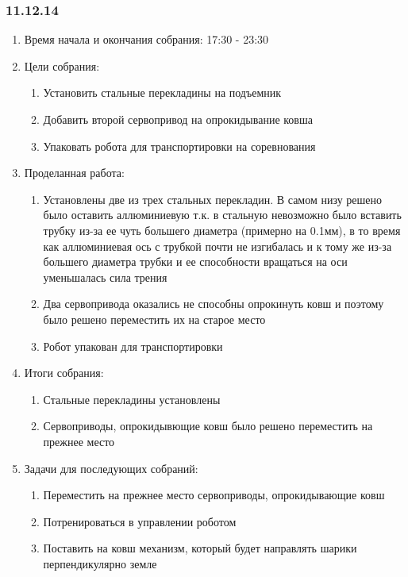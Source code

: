 \subsubsection{11.12.14}

\begin{enumerate}
	\item Время начала и окончания собрания: 17:30 - 23:30
	\item Цели собрания:
	\begin{enumerate}
		\item Установить стальные перекладины на подъемник
		
		\item Добавить второй сервопривод на опрокидывание ковша
		
		\item Упаковать робота для транспортировки на соревнования
	\end{enumerate}
	\item Проделанная работа:
	\begin{enumerate}
		\item Установлены две из трех стальных перекладин. В самом низу решено было оставить аллюминиевую т.к. в стальную невозможно было вставить трубку из-за ее чуть большего диаметра (примерно на 0.1мм), в то время как аллюминиевая ось с трубкой почти не изгибалась и к тому же из-за большего диаметра трубки и ее способности вращаться на оси уменьшалась сила трения
		
		\item Два сервопривода оказались не способны опрокинуть ковш и поэтому было решено переместить их на старое место
		
		\item Робот упакован для транспортировки
		
	\end{enumerate}
	\item Итоги собрания:
	\begin{enumerate}
		\item Стальные перекладины установлены
		
		\item Сервоприводы, опрокидывющие ковш было решено переместить на прежнее место
		
	\end{enumerate}
	\item Задачи для последующих собраний:
	\begin{enumerate}	
		\item Переместить на прежнее место сервоприводы, опрокидывающие ковш
		
		\item Потренироваться в управлении роботом
		
		\item Поставить на ковш механизм, который будет направлять шарики перпендикулярно земле
		
	\end{enumerate}
\end{enumerate}
\fillpage